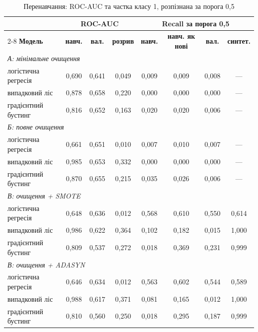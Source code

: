 \documentclass[14pt,a4paper]{extreport}
\begin{document}
\begin{table}[H]
\caption{Перенавчання: ROC-AUC та частка класу 1, розпізнана за порога 0,5}
\label{tab:gap}
\footnotesize
\renewcommand{\arraystretch}{1.15}
\setlength{\tabcolsep}{4pt}
\begin{tabularx}{\linewidth}{|X|c|c|c|c|c|c|c|}
\hline
 & \multicolumn{3}{c|}{\textbf{ROC-AUC}} & \multicolumn{4}{c|}{\textbf{Recall за порога 0,5}} \\
\cline{2-8}
\textbf{Модель} & \textbf{навч.} & \textbf{вал.} & \textbf{розрив} & \textbf{навч.} & \textbf{навч. як нові} & \textbf{вал.} & \textbf{синтет.} \\
\hline
\multicolumn{8}{|l|}{\textit{А: мінімальне очищення}} \\
\hline
логістична регресія & 0,690 & 0,641 & 0,049 & 0,009 & 0,009 & 0,008 & --- \\
\hline
випадковий ліс & 0,878 & 0,658 & 0,220 & 0,000 & 0,000 & 0,000 & --- \\
\hline
градієнтний бустинг & 0,816 & 0,652 & 0,163 & 0,020 & 0,020 & 0,006 & --- \\
\hline
\multicolumn{8}{|l|}{\textit{Б: повне очищення}} \\
\hline
логістична регресія & 0,661 & 0,651 & 0,010 & 0,007 & 0,010 & 0,007 & --- \\
\hline
випадковий ліс & 0,985 & 0,653 & 0,332 & 0,000 & 0,000 & 0,000 & --- \\
\hline
градієнтний бустинг & 0,870 & 0,655 & 0,215 & 0,035 & 0,026 & 0,006 & --- \\
\hline
\multicolumn{8}{|l|}{\textit{В: очищення + SMOTE}} \\
\hline
логістична регресія & 0,648 & 0,636 & 0,012 & 0,568 & 0,610 & 0,550 & 0,614 \\
\hline
випадковий ліс & 0,986 & 0,622 & 0,364 & 0,102 & 0,182 & 0,015 & 1,000 \\
\hline
градієнтний бустинг & 0,809 & 0,537 & 0,272 & 0,018 & 0,369 & 0,231 & 0,999 \\
\hline
\multicolumn{8}{|l|}{\textit{В: очищення + ADASYN}} \\
\hline
логістична регресія & 0,646 & 0,634 & 0,012 & 0,563 & 0,602 & 0,544 & 0,589 \\
\hline
випадковий ліс & 0,988 & 0,617 & 0,371 & 0,081 & 0,165 & 0,012 & 1,000 \\
\hline
градієнтний бустинг & 0,810 & 0,560 & 0,250 & 0,018 & 0,295 & 0,187 & 0,999 \\
\hline
\end{tabularx}
\end{table}
\end{document}
